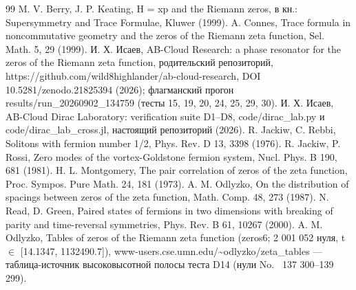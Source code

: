 \documentclass[11pt,a4paper]{article}
\begin{document}
\begin{thebibliography}{99}
 M. V. Berry, J. P. Keating, H = xp and the Riemann zeros, в кн.: Supersymmetry and Trace Formulae, Kluwer (1999).
 A. Connes, Trace formula in noncommutative geometry and the zeros of the Riemann zeta function, Sel. Math. 5, 29 (1999).
 И. Х. Исаев, AB-Cloud Research: a phase resonator for the zeros of the Riemann zeta function, родительский репозиторий, https://github.com/wild8highlander/ab-cloud-research, DOI 10.5281/zenodo.21825394 (2026); флагманский прогон results/run\_\allowbreak{}20260902\_\allowbreak{}134759 (тесты 15, 19, 20, 24, 25, 29, 30).
 И. Х. Исаев, AB-Cloud Dirac Laboratory: verification suite D1--D8, code/dirac\_\allowbreak{}lab.py и code/dirac\_\allowbreak{}lab\_\allowbreak{}cross.jl, настоящий репозиторий (2026).
 R. Jackiw, C. Rebbi, Solitons with fermion number 1/2, Phys. Rev. D 13, 3398 (1976).
 R. Jackiw, P. Rossi, Zero modes of the vortex-Goldstone fermion system, Nucl. Phys. B 190, 681 (1981).
 H. L. Montgomery, The pair correlation of zeros of the zeta function, Proc. Sympos. Pure Math. 24, 181 (1973).
 A. M. Odlyzko, On the distribution of spacings between zeros of the zeta function, Math. Comp. 48, 273 (1987).
 N. Read, D. Green, Paired states of fermions in two dimensions with breaking of parity and time-reversal symmetries, Phys. Rev. B 61, 10267 (2000).
 A. M. Odlyzko, Tables of zeros of the Riemann zeta function (zeros6; 2 001 052 нуля, t $\in$ [14.1347, 1132490.7]), www-users.cse.umn.edu/\textasciitilde{}odlyzko/zeta\_\allowbreak{}tables --- таблица-источник высоковысотной полосы теста D14 (нули No.~ 137 300--139 299).
\end{thebibliography}
\end{document}
